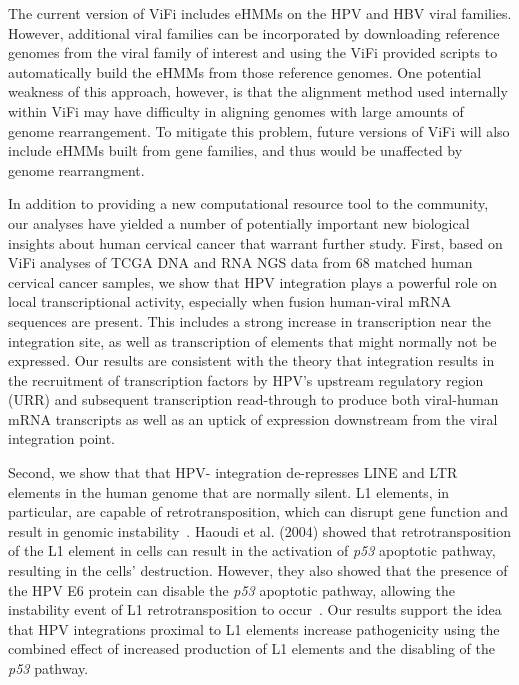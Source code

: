 \documentclass[a4,center,fleqn]{NAR}
\begin{document}
The current version of ViFi includes eHMMs on the HPV and HBV viral families.  However, additional viral families can be incorporated by downloading reference genomes from the viral family of interest and using the ViFi provided scripts to automatically build the eHMMs from those reference genomes.  One potential weakness of this approach, however, is that the alignment method used internally within ViFi may have difficulty in aligning genomes with large amounts of genome rearrangement.  To mitigate this problem, future versions of ViFi will also include eHMMs built from gene families, and thus would be unaffected by genome rearrangment.  

In addition to providing a new computational resource tool to the community, our analyses have yielded a number of potentially important new biological insights about human cervical cancer that warrant further study. First, based on ViFi analyses of TCGA DNA and RNA NGS data from 68 matched  human cervical cancer samples, we show that HPV integration plays a powerful role on local
transcriptional activity, especially when fusion human-viral mRNA
sequences are present.  This includes a strong increase in
transcription near the integration site, as well as transcription of
elements that might normally not be expressed.  Our results are
consistent with the theory that integration results in the recruitment
of transcription factors by HPV's upstream regulatory region (URR) and
subsequent transcription read-through to produce both viral-human mRNA
transcripts as well as an uptick of expression downstream from the
viral integration point.  

Second, we show that that HPV- integration de-represses LINE and LTR elements in the human genome that are normally silent. L1 elements, in particular, are capable of
retrotransposition, which can disrupt gene function and result in
genomic instability~\cite{Kazazian2002,Kemp2015}.  Haoudi et al. (2004) showed
that retrotransposition of the L1 element in cells can result in the
activation of \emph{p53} apoptotic pathway, resulting in the cells'
destruction.  However, they also showed that the presence of the HPV
E6 protein can disable the \emph{p53} apoptotic pathway, allowing the
instability event of L1 retrotransposition to
occur~\cite{Haoudi2004}. Our results support the idea that HPV
integrations proximal to L1 elements increase pathogenicity using the
combined effect of increased production of L1 elements and the
disabling of the \emph{p53} pathway.
\end{document}
